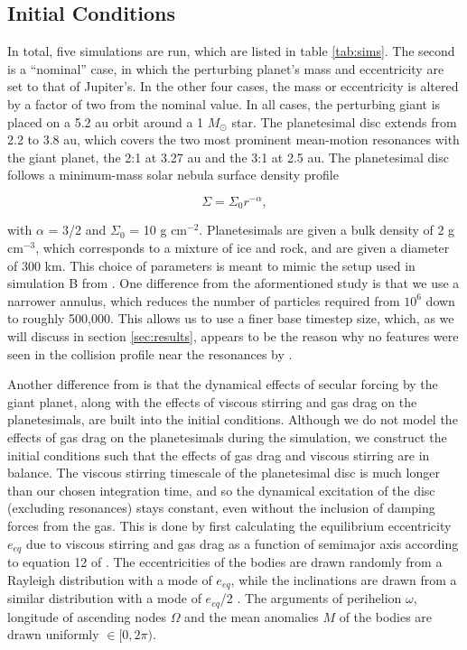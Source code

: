 \documentclass[fleqn,usenatbib]{mnras}
\begin{document}
\subsection{Initial Conditions}\label{sec:ics}

In total, five simulations are run, which are listed in table \ref{tab:sims}. The second is a ``nominal'' case, in which the perturbing planet's mass and eccentricity are set to that of Jupiter's. 
In the other four cases, the mass or eccentricity is altered by a factor of two from the nominal value. In all cases, the perturbing giant is placed on a 5.2 au orbit around a 1 
$M_{\odot}$ star. The planetesimal disc extends from 2.2 to 3.8 au, which covers the two most prominent mean-motion resonances with the giant planet, the 2:1 at 3.27 au and the 3:1 at 
2.5 au. The planetesimal disc follows a minimum-mass solar nebula surface density profile \citep{1981PThPS..70...35H}

\begin{equation}\label{eq:surf_den}
	\Sigma = \Sigma_{0} r^{-\alpha},
\end{equation}

\noindent with $\alpha$ = 3/2 and $\Sigma_{0}$ = 10 g cm$^{-2}$. Planetesimals are given a bulk density of 2 g cm$^{-3}$, which corresponds to a mixture of ice and rock, and 
are given a diameter of 300 km. This choice of parameters is meant to mimic the setup used in simulation B from \citet{2000Icar..143...45R}. One difference from the 
aformentioned study is that we use a narrower annulus, which reduces the number of particles required from $10^6$ down to roughly 500,000. This allows us to use a finer base timestep 
size, which, as we will discuss in section \ref{sec:results}, appears to be the reason why no features were seen in the collision profile near the resonances by \citet{2000Icar..143...45R}.

Another difference from \citet{2000Icar..143...45R} is that the dynamical effects of secular forcing by the giant planet, along with the effects of viscous stirring and gas drag on the 
planetesimals, are built into the initial conditions. Although we do not model the effects of gas drag on the planetesimals during the simulation, we construct the initial conditions 
such that the effects of gas drag and viscous stirring are in balance. The viscous stirring timescale of the planetesimal disc is much longer than our chosen integration time, and so the 
dynamical excitation of the disc (excluding resonances) stays constant, even without the inclusion of damping forces from the gas. This is done by first calculating the equilibrium 
eccentricity $e_{eq}$ due to viscous stirring and gas drag as a function of semimajor axis according to equation 12 of \citet{2002ApJ...581..666K}. The eccentricities of the bodies are 
drawn randomly from a Rayleigh distribution with a mode of $e_{eq}$, while the inclinations are drawn from a similar distribution with a mode of $e_{eq}$/2 \citep{1993MNRAS.263..875I}. 
The arguments of perihelion $\omega$, longitude of ascending nodes $\Omega$ and the mean anomalies $M$ of the bodies are drawn uniformly $\in [0, 2 \pi)$.
\end{document}
